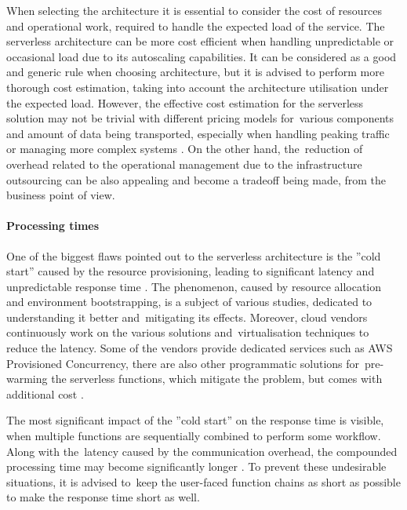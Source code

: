 When selecting the architecture it is essential to consider the cost of resources and operational work, required to handle the expected load of the service.
The serverless architecture can be more cost efficient when handling unpredictable or occasional load due to its autoscaling capabilities. It can be considered as a good and generic rule when choosing architecture, but it is advised to perform more thorough cost estimation, taking into account the architecture utilisation under the expected load.
However, the effective cost estimation for the serverless solution may not be trivial with different pricing models for~various components and amount of data being transported, especially when handling peaking traffic or managing more complex systems \cite{EvaluationOfServerlessApplicationProgrammingModel}.
On the other hand, the~reduction of overhead related to the operational management due to the infrastructure outsourcing can be also appealing and become a tradeoff being made, from the business point of view.

\paragraph{Processing times} \label{chapter:serverless-suitability-processing-time}
 
One of the biggest flaws pointed out to the serverless architecture is the ''cold start'' caused by the resource provisioning, leading to significant latency and unpredictable response time \cite{BerkeleyServerless}.
The phenomenon, caused by resource allocation and environment bootstrapping, is a subject of various studies, dedicated to understanding it better and~mitigating its effects. Moreover, cloud vendors continuously work on the various solutions and~virtualisation techniques to reduce the latency. Some of the vendors provide dedicated services such as AWS Provisioned Concurrency, there are also other programmatic solutions for~pre-warming the serverless functions, which mitigate the problem, but comes with additional cost \cite{MartinFowlerServerless}.

The most significant impact of the ''cold start'' on the response time is visible, when multiple functions are sequentially combined to perform some workflow. Along with the~latency caused by the communication overhead, the compounded processing time may become significantly longer \cite{EvaluationOfServerlessApplicationProgrammingModel}.
To prevent these undesirable situations, it is advised to~keep the user-faced function chains as short as possible to make the response time short as well.

